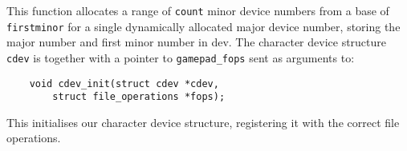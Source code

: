 This function allocates a range of \texttt{count} minor device numbers from a
base of \texttt{firstminor} for a single dynamically allocated major device
number, storing the major number and first minor number in dev. The character
device structure \texttt{cdev} is together with a pointer to
\texttt{gamepad\_fops} sent as arguments to:

\begin{lstlisting}
	void cdev_init(struct cdev *cdev,
		struct file_operations *fops);
\end{lstlisting}

This initialises our character device structure, registering it with the correct
file operations.
